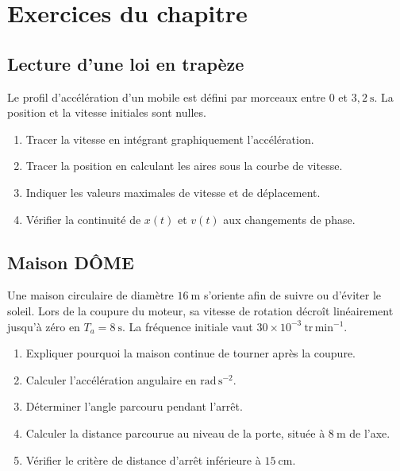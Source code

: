 
\section{Exercices du chapitre}
\label{sec:cine-exercices}

\subsection{Lecture d'une loi en trapèze}

Le profil d'accélération d'un mobile est défini par morceaux entre
$0$ et $3{,}2\ \mathrm s$. La position et la vitesse initiales sont
nulles.


\begin{enumerate}
  \item Tracer la vitesse en intégrant graphiquement l'accélération.
  \item Tracer la position en calculant les aires sous la courbe de vitesse.
  \item Indiquer les valeurs maximales de vitesse et de déplacement.
  \item Vérifier la continuité de $x(t)$ et $v(t)$ aux changements de phase.
\end{enumerate}

\subsection{Maison DÔME}

Une maison circulaire de diamètre $16\ \mathrm m$ s'oriente afin de
suivre ou d'éviter le soleil. Lors de la coupure du moteur, sa vitesse
de rotation décroît linéairement jusqu'à zéro en $T_a=8\ \mathrm s$.
La fréquence initiale vaut $30\times10^{-3}\ \mathrm{tr\,min^{-1}}$.


\begin{enumerate}
  \item Expliquer pourquoi la maison continue de tourner après la coupure.
  \item Calculer l'accélération angulaire en $\mathrm{rad\,s^{-2}}$.
  \item Déterminer l'angle parcouru pendant l'arrêt.
  \item Calculer la distance parcourue au niveau de la porte, située à $8\ \mathrm m$ de l'axe.
  \item Vérifier le critère de distance d'arrêt inférieure à $15\ \mathrm{cm}$.
\end{enumerate}

